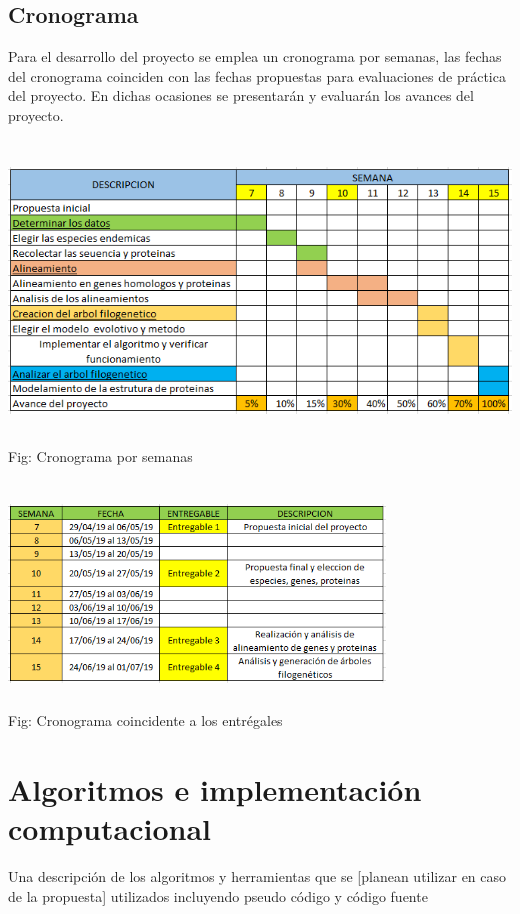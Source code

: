 \documentclass[a4paper]{article}
\begin{document}
\subsection{Cronograma}
Para el desarrollo del proyecto se emplea un cronograma por semanas, las fechas del cronograma coinciden con las fechas propuestas para evaluaciones de práctica del proyecto. En dichas ocasiones se presentarán y evaluarán los avances del proyecto.

\begin{center}
	\includegraphics[width=14cm,height=8cm]{cronoextendido.png}\\
	Fig: Cronograma por semanas	
\end{center}

\begin{center}
	\includegraphics[width=10cm,height=6cm]{cronoentregrable.png}\\
	Fig: Cronograma coincidente a los entrégales
\end{center}


\vspace*{0.2in}


\section{Algoritmos e implementación computacional}
Una descripción de los algoritmos y herramientas que se [planean utilizar en caso de la propuesta] utilizados incluyendo pseudo código y código fuente
\end{document}
